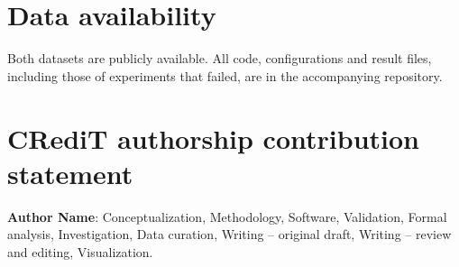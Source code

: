 \documentclass[preprint,12pt]{elsarticle}
\begin{document}
\section*{Data availability}
Both datasets are publicly available. All code, configurations and result files,
including those of experiments that failed, are in the accompanying repository.

\section*{CRediT authorship contribution statement}
\textbf{Author Name}: Conceptualization, Methodology, Software, Validation, Formal analysis, Investigation, Data curation, Writing -- original draft, Writing -- review and editing, Visualization.



\end{document}
